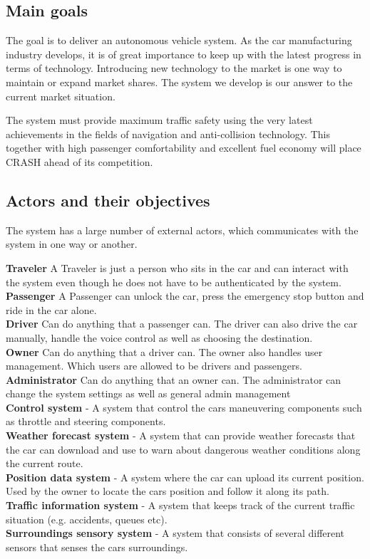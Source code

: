 \documentclass{article}
\begin{document}
\subsection{Main goals}
The goal is to deliver an autonomous vehicle system. As the car manufacturing industry develops, it is of great importance to keep up with the latest progress in terms of technology. Introducing new technology to the market is one way to maintain or expand market shares. The system we develop is our answer to the current market situation.

The system must provide maximum traffic safety using the very latest achievements in the fields of navigation and anti-collision technology. This together with high passenger comfortability and excellent fuel economy will place CRASH ahead of its competition.

\subsection{Actors and their objectives}
The system has a large number of external actors, which communicates with the system in one way or another.
\newline




\noindent
\textbf{Traveler} A Traveler is just a person who sits in the car and can interact with the system even though he does not have to be authenticated by the system.\\
\textbf{Passenger} A Passenger can unlock the car, press the emergency stop button and ride in the car alone.\\
\textbf{Driver} Can do anything that a passenger can.
The driver can also drive the car manually, handle the voice control as well as choosing the destination. \\
\textbf{Owner} Can do anything that a driver can. The owner also handles user management. Which users are allowed to be drivers and passengers. \\
\textbf{Administrator} Can do anything that an owner can.
The administrator can change the system settings as well as general admin management \\
\textbf{Control system} - A system that control the cars maneuvering components such as throttle and steering components. \\
\textbf{Weather forecast system} - A system that can provide weather forecasts that the car can download and use to warn about dangerous weather conditions along the current route.  \\
\textbf{Position data system} - A system where the car can upload its current position. Used by the owner to locate the cars position and follow it along its path.  \\
\textbf{Traffic information system} - A system that keeps track of the current traffic situation (e.g. accidents, queues etc). \\
\textbf{Surroundings sensory system} - A system that consists of several different sensors that senses the cars surroundings.  \\
\end{document}
